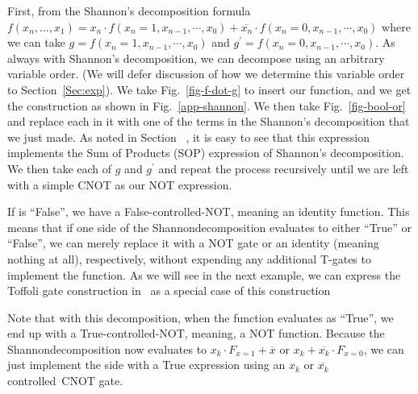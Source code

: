 \documentclass[paper]{ieice}
\providecommand{\DIFadd}[1]{{\protect\color{blue}{#1}}} %
\providecommand{\DIFaddbegin}{} %
\providecommand{\DIFaddend}{} %
\newcommand{\DIFaddincludegraphics}[2][]{{\color{blue}\fbox{\DIFOincludegraphics[#1]{#2}}}} %
\DeclareRobustCommand{\DIFaddbegin}{\DIFOaddbegin \let\includegraphics\DIFaddincludegraphics} %
\DeclareRobustCommand{\DIFaddend}{\DIFOaddend \let\includegraphics\DIFOincludegraphics} %
\begin{document}
First, from the Shannon's decomposition
formula~$f(x_n,...,x_1) = x_n \cdot f(x_n=1,x_{n-1},\cdots,x_0) + \overline{x_n} \cdot f(x_n=0,x_{n-1},\cdots,x_0)$
where we can take $g=f(x_n=1,x_{n-1},\cdots,x_0)$ and $g^{\prime}=f(x_n=0,x_{n-1},\cdots,x_0)$. As always with
Shannon's decomposition, we can decompose using an arbitrary variable order. (We will defer discussion of how we
determine this variable order to Section~\ref{Sec:exp}). We take Fig.~\ref{fig-f-dot-g} to insert our function, and
we get the construction as shown in Fig.~\ref{app-shannon}. We then take Fig.~\ref{fig-bool-or} and replace each
 \DIFaddbegin \DIFadd{FCNOT }\DIFaddend in it with one of the terms in the Shannon's decomposition that we just made. As noted in
Section~ \DIFaddbegin \DIFadd{\ref{Subsec:FNOT} }\DIFaddend , it is easy to see that this expression implements the Sum of Products (SOP) expression
of Shannon's decomposition. We then take each of $g$ and $g^{\prime}$ and repeat the process recursively until we
are left with a simple CNOT as our  \DIFaddbegin \DIFadd{F-controlled }\DIFaddend NOT expression.

If  \DIFaddbegin \DIFadd{the function }\DIFaddend is ``False'', we have a False-controlled-NOT, meaning an identity function. This means that if one side of
the Shannon\DIFaddbegin \DIFadd{'s }\DIFaddend decomposition evaluates to either ``True'' or ``False'', we can merely replace it with a NOT gate or an
identity (meaning nothing at all), respectively, without expending any additional T-gates to implement the
function. As we will see in the next example, we can express the  \DIFaddbegin \DIFadd{relative phase }\DIFaddend Toffoli gate construction
in~\cite{bib-amy-phase-state} as a special case of this construction\DIFaddbegin \DIFadd{.
 }\DIFaddend 

Note that with this decomposition, when the function evaluates as ``True'', we end up with a True-controlled-NOT,
meaning, a NOT function. Because the Shannon\DIFaddbegin \DIFadd{'s }\DIFaddend decomposition now evaluates to  $x_k \cdot F_{x=1} + \overline{x}$ or
$x_k + \overline{x_k} \cdot F_{x=0}$, we can just implement the side with a True expression using an $x_k$ or
$\overline{x_k}$ controlled~CNOT gate. \DIFaddbegin \DIFadd{We show the results of this in Fig.~\ref{app-shannon}.
 }\DIFaddend 
\end{document}
